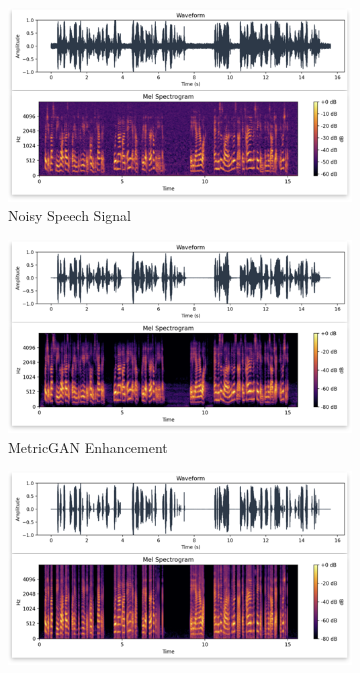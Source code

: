 \begin{figure}[H]
    \centering
         \begin{subfigure}[b]{0.3\textwidth}
             \centering
             \includegraphics[width=\textwidth]{figures/snr15_o.png}
             \caption{Noisy Speech Signal}
             \label{fig:y equals x}
         \end{subfigure}
         \hfill
         \begin{subfigure}[b]{0.3\textwidth}
             \centering
             \includegraphics[width=\textwidth]{figures/snr15_e.png}
             \caption{MetricGAN Enhancement}
             \label{fig:three sin x}
         \end{subfigure}
         \hfill
         \begin{subfigure}[b]{0.3\textwidth}
             \centering
             \includegraphics[width=\textwidth]{figures/snr15_w.png}

\end{subfigure}
\end{figure}
